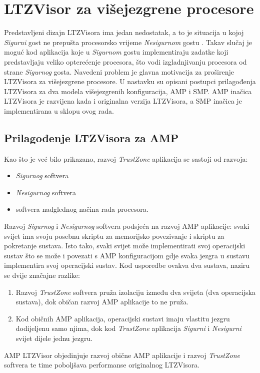 \documentclass[times, utf8, diplomski, numeric]{fer}
\begin{document}
\chapter{LTZVisor za višejezgrene procesore}
Predstavljeni dizajn LTZVisora ima jedan nedostatak, a to je situacija u kojoj \textit{Sigurni} gost ne prepušta procesorsko
vrijeme \textit{Nesigurnom} gostu \cite{amp_ltzvisor}. Takav slučaj je moguć kod aplikacija koje u \textit{Sigurnom} gostu
implementiraju zadatke koji predstavljaju veliko opterećenje procesora, što vodi izgladnjivanju procesora od strane
\textit{Sigurnog} gosta. Navedeni problem je glavna motivacija za proširenje LTZVisora za višejezgrene procesore. U nastavku su
opisani postupci prilagođenja LTZVisora za dva modela višejezgrenih konfiguracija, AMP i SMP. AMP inačica LTZVisora je razvijena
kada i originalna verzija LTZVisora, a SMP inačica je implementirana u sklopu ovog rada.

\section{Prilagođenje LTZVisora za AMP}
Kao što je već bilo prikazano, razvoj \textit{TrustZone} aplikacija se sastoji od razvoja:
\begin{itemize}
  \item {\textit{Sigurnog} softvera}
  \item{\textit{Nesigurnog} softvera}
  \item{softvera nadglednog načina rada procesora.}
\end{itemize}
Razvoj \textit{Sigurnog} i \textit{Nesigurnog} softvera podsjeća na razvoj AMP aplikacije: svaki svijet ima svoju posebnu
skriptu za memorijsko povezivanje i skriptu za pokretanje sustava. Isto tako, svaki svijet može implementirati svoj operacijski
sustav što se može i povezati s AMP konfiguracijom gdje svaka jezgra u sustavu implementira svoj operacijski sustav. Kod
usporedbe ovakva dva sustava, naziru se dvije značajne razlike:
\begin{enumerate}
  \item {Razvoj \textit{TrustZone} softvera pruža izolaciju između dva svijeta (dva operacijska sustava), dok običan razvoj
  AMP aplikacije to ne pruža.}
  \item{Kod običnih AMP aplikacija, operacijski sustavi imaju vlastitu jezgru dodijeljenu samo njima, dok kod
  \textit{TrustZone} aplikacija \textit{Sigurni} i \textit{Nesigurni} svijet dijele jednu jezgru.}
\end{enumerate}
AMP LTZVisor objedinjuje razvoj obične AMP aplikacije i razvoj \textit{TrustZone} softvera te time poboljšava performanse
originalnog LTZVisora.
\end{document}
